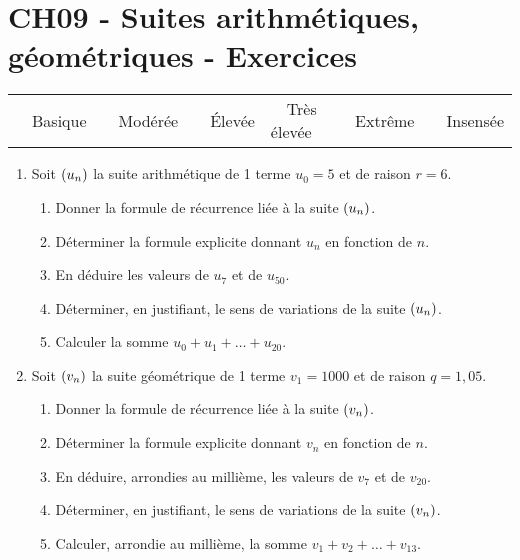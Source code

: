 \documentclass[a4paper,11pt]{article}
\author{Pierquet}
\title{\nomfichier}
\begin{document}
\pagestyle{fancy}

\part{CH09 - Suites arithmétiques, géométriques - Exercices}

\medskip

\begin{caide}
{\setlength\arrayrulewidth{1.5pt} 
\begin{tabularx}{\linewidth}{Y|Y|Y|Y|Y|Y}
	~~\textsf{Basique} & ~~\textsf{Modérée} & ~~\textsf{Élevée} & ~~\textsf{Très élevée} & ~~\textsf{Extrême} & ~~\textsf{Insensée} \\
\end{tabularx}}
\end{caide}


\begin{enumerate}
	\item Soit $\suiten$ la suite arithmétique de 1 terme $u_0=5$ et de raison $r=6$.
	\begin{enumerate}
		\item Donner la formule de récurrence liée à la suite $\suiten$.
		\item Déterminer la formule explicite donnant $u_n$ en fonction de $n$.
		\item En déduire les valeurs de $u_7$ et de $u_{50}$.
		\item Déterminer, en justifiant, le sens de variations de la suite $\suiten$.
		\item Calculer la somme $u_0 + u_1 + \ldots + u_{20}$.
	\end{enumerate}
	\item Soit $\suiten[v]$ la suite géométrique de 1 terme $v_1=1000$ et de raison $q=1,05$.
	\begin{enumerate}
		\item Donner la formule de récurrence liée à la suite $\suiten[v]$.
		\item Déterminer la formule explicite donnant $v_n$ en fonction de $n$.
		\item En déduire, arrondies au millième, les valeurs de $v_7$ et de $v_{20}$.
		\item Déterminer, en justifiant, le sens de variations de la suite $\suiten[v]$.
		\item Calculer, arrondie au millième,  la somme $v_1 + v_2 + \ldots + v_{13}$.
	\end{enumerate} 
\end{enumerate}
\end{document}
